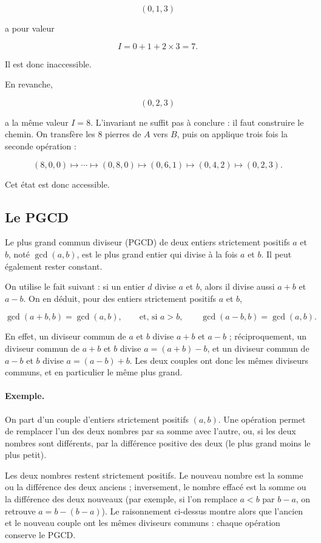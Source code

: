 \[
(0,1,3)
\]

a pour valeur

\[
I=0+1+2\times3=7.
\]

Il est donc inaccessible.

En revanche,

\[
(0,2,3)
\]

a la même valeur \(I=8\). L'invariant ne suffit pas à conclure : il faut
construire le chemin. On transfère les \(8\) pierres de \(A\) vers \(B\),
puis on applique trois fois la seconde opération :

\[
(8,0,0)\longmapsto\cdots\longmapsto(0,8,0)\longmapsto(0,6,1)
\longmapsto(0,4,2)\longmapsto(0,2,3).
\]

Cet état est donc accessible.

\subsection{Le PGCD}

Le plus grand commun diviseur (PGCD) de deux entiers strictement positifs
\(a\) et \(b\), noté \(\gcd(a,b)\), est le plus grand entier qui divise à la
fois \(a\) et \(b\). Il peut également rester constant.

On utilise le fait suivant : si un entier \(d\) divise \(a\) et \(b\), alors
il divise aussi \(a+b\) et \(a-b\). On en déduit, pour des entiers
strictement positifs \(a\) et \(b\),

\[
\boxed{
\gcd(a+b,b)=\gcd(a,b),
\qquad\text{et, si }a>b,\qquad
\gcd(a-b,b)=\gcd(a,b).
}
\]

En effet, un diviseur commun de \(a\) et \(b\) divise \(a+b\) et \(a-b\) ;
réciproquement, un diviseur commun de \(a+b\) et \(b\) divise
\(a=(a+b)-b\), et un diviseur commun de \(a-b\) et \(b\) divise
\(a=(a-b)+b\). Les deux couples ont donc les mêmes diviseurs communs, et en
particulier le même plus grand.

\paragraph{Exemple.}

On part d'un couple d'entiers strictement positifs \((a,b)\). Une opération
permet de remplacer l'un des deux nombres par sa somme avec l'autre, ou, si
les deux nombres sont différents, par la différence positive des deux
(le plus grand moins le plus petit).

Les deux nombres restent strictement positifs. Le nouveau nombre est la somme
ou la différence des deux anciens ; inversement, le nombre effacé est la somme
ou la différence des deux nouveaux (par exemple, si l'on remplace \(a<b\) par
\(b-a\), on retrouve \(a=b-(b-a)\)). Le raisonnement ci-dessus montre alors
que l'ancien et le nouveau couple ont les mêmes diviseurs communs : chaque
opération conserve le PGCD.

